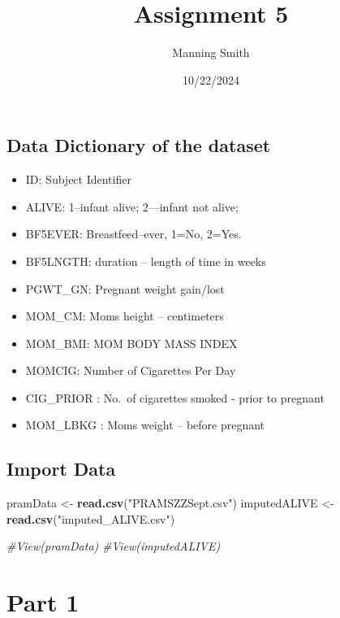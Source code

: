 \documentclass[
]{article}
\title{Assignment 5}
\author{Manning Smith}
\date{10/22/2024}
\newenvironment{Shaded}{\begin{snugshade}}{\end{snugshade}}
\newcommand{\CommentTok}[1]{\textcolor[rgb]{0.56,0.35,0.01}{\textit{#1}}}
\newcommand{\FunctionTok}[1]{\textcolor[rgb]{0.13,0.29,0.53}{\textbf{#1}}}
\newcommand{\NormalTok}[1]{#1}
\newcommand{\OtherTok}[1]{\textcolor[rgb]{0.56,0.35,0.01}{#1}}
\newcommand{\StringTok}[1]{\textcolor[rgb]{0.31,0.60,0.02}{#1}}
\providecommand{\tightlist}{%
  \setlength{\itemsep}{0pt}\setlength{\parskip}{0pt}}
\begin{document}
\maketitle

\subsection{Data Dictionary of the
dataset}\label{data-dictionary-of-the-dataset}

\begin{itemize}
\tightlist
\item
  ID: Subject Identifier
\item
  ALIVE: 1--infant alive; 2---infant not alive;
\item
  BF5EVER: Breastfeed--ever, 1=No, 2=Yes.
\item
  BF5LNGTH: duration -- length of time in weeks
\item
  PGWT\_GN: Pregnant weight gain/lost
\item
  MOM\_CM: Moms height -- centimeters
\item
  MOM\_BMI: MOM BODY MASS INDEX
\item
  MOMCIG: Number of Cigarettes Per Day
\item
  CIG\_PRIOR : No.~of cigarettes smoked - prior to pregnant
\item
  MOM\_LBKG : Moms weight -- before pregnant
\end{itemize}

\subsection{Import Data}\label{import-data}

\begin{Shaded}
\begin{Highlighting}[]
\NormalTok{pramData }\OtherTok{\textless{}{-}} \FunctionTok{read.csv}\NormalTok{(}\StringTok{"PRAMSZZSept.csv"}\NormalTok{)}
\NormalTok{imputedALIVE }\OtherTok{\textless{}{-}} \FunctionTok{read.csv}\NormalTok{(}\StringTok{"imputed\_ALIVE.csv"}\NormalTok{)}

\CommentTok{\#View(pramData)}
\CommentTok{\#View(imputedALIVE)}
\end{Highlighting}
\end{Shaded}

\newpage

\section{Part 1}\label{part-1}
\end{document}
